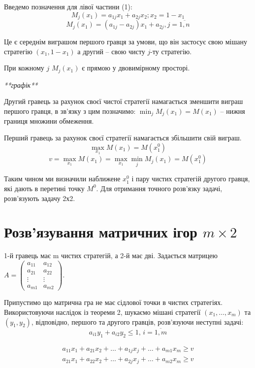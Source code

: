\documentclass[12pt,a4paper]{book}
\begin{document}
Введемо позначення для лівої частини (1):
\[M_j(x_1) = a_{1j}x_1+a_{2j}x_2; x_2=1-x_1\]
\begin{equation}
M_j(x_1)=(a_{1j}-a_{2j})x_1+a_{2j}, j=\overline{1,n}
\end{equation}

Це є середнім виграшом першого гравця за умови, що він застосує свою мішану стратегію $(x_1,1-x_1)$ а другий -- свою чисту $j$-ту стратегію.

При кожному $j$ $M_j(x_1)$ є прямою у двовимірному просторі.

\emph{**графік**}

Другий гравець за рахунок своєї чистої стратегії намагається зменшити виграш першого гравця, в зв'язку з цим позначимо:
$\displaystyle \min_jM_j(x_1)=M(x_1)$ -- нижня границя множини обмеження.

Перший гравець за рахунок своєї стратегії намагається збільшити свій виграш.
\[\max_{x_1} M(x_1) = M(x_1^0)\]
\[v=\max_{x_1} M(x_1)=\max_{x_1} \min_jM_j(x_1)=M(x_1^0)\]

Таким чином ми визначили наближене $x_1^0$ і пару чистих стратегій другого гравця, які дають в перетині точку $M^0$. Для отримання точного розв'язку задачі, розв'язують задачу 2х2. 

\section{Розв’язування матричних ігор $m \times 2$}

1-й гравець має m чистих стратегій, а 2-й має дві.
Задається матрицею $A=\left ( \begin{array}{cc}
a_{11}&a_{12}\\
a_{21}&a_{22}\\
\vdots&\vdots\\
a_{m1}&a_{m2}
\end{array}\right)$.

Припустимо що матрична гра не має сідлової точки в чистих стратегіях. Використовуючи наслідок із теореми 2, шукаємо мішані стратегії $(x_1,\dots, x_m)$ та $(y_1,y_2)$, відповідно, першого та другого гравців, розв'язуючи неступні задачі:
\begin{equation}
a_{i1}y_1+a_{i2}y_2 \le 1, \, i=\overline{1,m}
\end{equation}

\begin{equation}
\begin{array}{l}
a_{11}x_1+a_{21}x_2+\dots+a_{1j}x_j+\dots+a_{m1}x_m \ge v\\
a_{21}x_1+a_{22}x_2+\dots+a_{2j}x_j+\dots+a_{m2}x_m \ge v
\end{array}
\end{equation}
\end{document}
